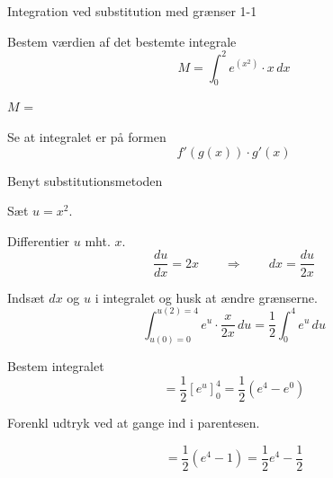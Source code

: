 \documentclass{article}
\begin{document}
\tableofcontents

\begin{exercise}{Integration ved substitution med grænser 1-1}
	
	
	Bestem værdien af det bestemte integrale
	\[
	M = \int_0^2 e^{(x^2)} \cdot x \, dx
	\]
	
	$M$ =  
	
	
	
	\hint
	
	Se at integralet er på formen
	\[
	f'(g(x)) \cdot g'(x)
	\]
	
	\hint
	
	Benyt substitutionsmetoden
	
	\hint
	
	Sæt $u=x^2$.
	
	
	\hint
	
	Differentier $u$ mht. $x$.
	\[
	\frac{du}{dx} = 2x \qquad	\Rightarrow \qquad dx = \frac{du}{2x}
	\]
	
	\hint
	
	Indsæt $dx$ og $u$ i integralet og husk at ændre grænserne.
	\[
	\int_{u(0)=0}^{u(2)=4} e^{u} \cdot \frac{x}{2x} \, du = \frac{1}{2} \int_{0}^{4} e^u \, du
	\]
	

	
	\hint
	
	Bestem integralet
	\[
	= \frac{1}{2} \left[e^u\right]_0^4 = \frac{1}{2} \left(  e^4-e^0 \right)
	\]
	
	\hint
	Forenkl udtryk ved at gange ind i parentesen.
	
	\hint
	
	\[
	= \frac{1}{2} \left(  e^4-1 \right) = \frac{1}{2} e^4 - \frac{1}{2}
	\]
	
	
	
\end{exercise}

\newpage
\end{document}

